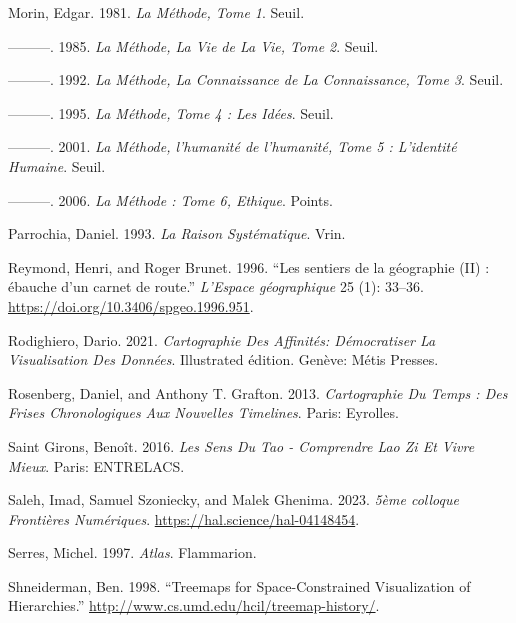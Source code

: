\documentclass[
  letterpaper,
  DIV=11,
  numbers=noendperiod]{scrreprt}
\newlength{\cslhangindent}
\newlength{\cslentryspacingunit} %
\newenvironment{CSLReferences}[2] %
 {%
  \setlength{\parindent}{0pt}
  \ifodd #1
  \let\oldpar\par
  \def\par{\hangindent=\cslhangindent\oldpar}
  \fi
  \setlength{\parskip}{#2\cslentryspacingunit}
 }%
 {}
\begin{document}
\begin{CSLReferences}{1}{0}
\leavevmode{}%
Morin, Edgar. 1981. \emph{La Méthode, Tome 1}. Seuil.

\leavevmode{}%
---------. 1985. \emph{La Méthode, La Vie de La Vie, Tome 2}. Seuil.

\leavevmode{}%
---------. 1992. \emph{La Méthode, La Connaissance de La Connaissance,
Tome 3}. Seuil.

\leavevmode{}%
---------. 1995. \emph{La Méthode, Tome 4 : Les Idées}. Seuil.

\leavevmode{}%
---------. 2001. \emph{La Méthode, l'humanité de l'humanité, Tome 5 :
L'identité Humaine}. Seuil.

\leavevmode{}%
---------. 2006. \emph{La Méthode : Tome 6, Ethique}. Points.

\leavevmode{}%
Parrochia, Daniel. 1993. \emph{La Raison Systématique}. Vrin.

\leavevmode{}%
Reymond, Henri, and Roger Brunet. 1996. {``Les sentiers de la géographie
(II) : ébauche d'un carnet de route.''} \emph{L'Espace géographique} 25
(1): 33--36. \url{https://doi.org/10.3406/spgeo.1996.951}.

\leavevmode{}%
Rodighiero, Dario. 2021. \emph{Cartographie Des Affinités: Démocratiser
La Visualisation Des Données}. Illustrated édition. Genève: Métis
Presses.

\leavevmode{}%
Rosenberg, Daniel, and Anthony T. Grafton. 2013. \emph{Cartographie Du
Temps : Des Frises Chronologiques Aux Nouvelles Timelines}. Paris:
Eyrolles.

\leavevmode{}%
Saint Girons, Benoît. 2016. \emph{Les Sens Du Tao - Comprendre Lao Zi Et
Vivre Mieux}. Paris: ENTRELACS.

\leavevmode{}%
Saleh, Imad, Samuel Szoniecky, and Malek Ghenima. 2023. \emph{5ème
colloque Frontières Numériques}. \url{https://hal.science/hal-04148454}.

\leavevmode{}%
Serres, Michel. 1997. \emph{Atlas}. Flammarion.

\leavevmode{}%
Shneiderman, Ben. 1998. {``Treemaps for Space-Constrained Visualization
of Hierarchies.''} \url{http://www.cs.umd.edu/hcil/treemap-history/}.


\end{CSLReferences}
\end{document}
